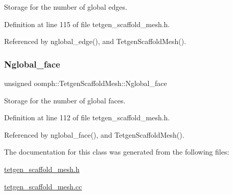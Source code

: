 Storage for the number of global edges. 



Definition at line 115 of file tetgen\+\_\+scaffold\+\_\+mesh.\+h.



Referenced by nglobal\+\_\+edge(), and Tetgen\+Scaffold\+Mesh().

\mbox{\label{classoomph_1_1TetgenScaffoldMesh_a0439e81af29a84043e68d107c71a66c4}} 
\subsubsection{\texorpdfstring{Nglobal\+\_\+face}{Nglobal\_face}}
{\footnotesize\ttfamily unsigned oomph\+::\+Tetgen\+Scaffold\+Mesh\+::\+Nglobal\+\_\+face\hspace{0.3cm}{\ttfamily [protected]}}



Storage for the number of global faces. 



Definition at line 112 of file tetgen\+\_\+scaffold\+\_\+mesh.\+h.



Referenced by nglobal\+\_\+face(), and Tetgen\+Scaffold\+Mesh().



The documentation for this class was generated from the following files\+:\begin{DoxyCompactItemize}
\item 
\hyperlink{tetgen__scaffold__mesh_8h}{tetgen\+\_\+scaffold\+\_\+mesh.\+h}\item 
\hyperlink{tetgen__scaffold__mesh_8cc}{tetgen\+\_\+scaffold\+\_\+mesh.\+cc}\end{DoxyCompactItemize}
